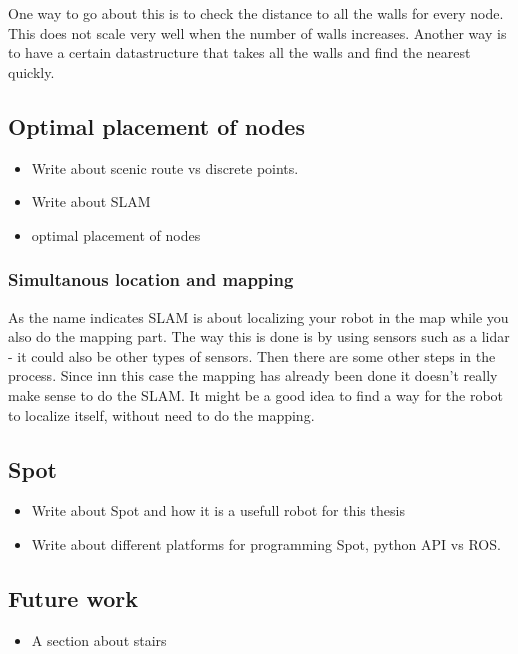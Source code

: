One way to go about this is to check the distance to all the walls for every node. This does not scale very well when the number of walls increases. 
Another way is to have a certain datastructure that takes all the walls and find the nearest quickly.





















\subsection{Optimal placement of nodes}
\begin{itemize}
    \item Write about scenic route vs discrete points.
    \item Write about SLAM
    \item optimal placement of nodes
\end{itemize}

\subsubsection{Simultanous location and mapping}
As the name indicates SLAM is about localizing your robot in the map while you also do the mapping part. The way this is done is by using sensors such as a lidar - it could also be other types of sensors. Then there are some other steps in the process. Since inn this case the mapping has already been done it doesn't really make sense to do the SLAM. It might be a good idea to find a way for the robot to localize itself, without need to do the mapping.



\subsection{Spot}
\begin{itemize}
    \item Write about Spot and how it is a usefull robot for this thesis
    \item Write about different platforms for programming Spot, python API vs ROS.
\end{itemize}

\subsection{Future work}
\begin{itemize}
    \item A section about stairs
\end{itemize}


